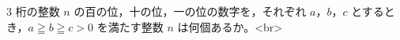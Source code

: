 $3$ 桁の整数 $n$ の百の位，十の位，一の位の数字を，それぞれ $a$，$b$，$c$ とするとき，$a \geqq b \geqq c > 0$ を満たす整数 $n$ は何個あるか。<br>

